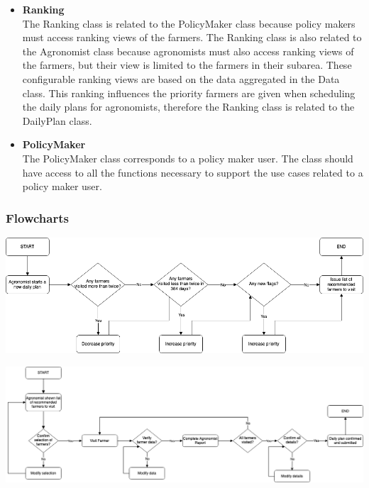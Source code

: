 \begin{itemize}
\item \textbf{Ranking}\\
The Ranking class is related to the PolicyMaker class because policy makers must access ranking views of the farmers. The Ranking class is also related to the Agronomist class because agronomists must also access ranking views of the farmers, but their view is limited to the farmers in their subarea. These configurable ranking views are based on the data aggregated in the Data class. This ranking influences the priority farmers are given when scheduling the daily plans for agronomists, therefore the Ranking class is related to the DailyPlan class.

\item \textbf{PolicyMaker}\\
The PolicyMaker class corresponds to a policy maker user. The class should have access to all the functions necessary to support the use cases related to a policy maker user. 

\end{itemize}

\subsubsection{Flowcharts}


\begin{center}
\includegraphics[scale=0.4]{../images_diagrams/adjustvisitpriority.png}
\end{center}



\begin{center}
\includegraphics[scale=0.4]{../images_diagrams/agronomistexecutesplan.png}
\end{center}

